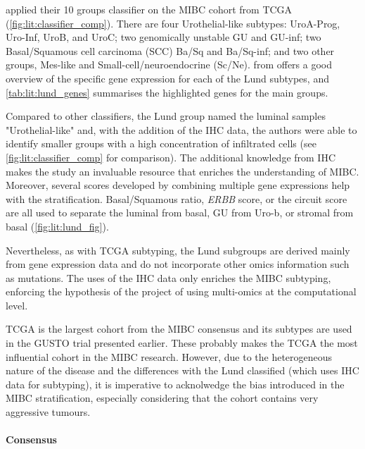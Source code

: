 \citet{Marzouka2018-ge} applied their 10 groups classifier on the MIBC cohort from TCGA (\cref{fig:lit:classifier_comp}). There are four Urothelial-like subtypes: UroA-Prog, Uro-Inf, UroB, and UroC; two genomically unstable GU and GU-inf; two Basal/Squamous cell carcinoma (SCC) Ba/Sq and Ba/Sq-inf; and two other groups, Mes-like and Small-cell/neuroendocrine (Sc/Ne).  from \citet{Marzouka2018-ge} offers a good overview of the specific gene expression for each of the Lund subtypes, and \cref{tab:lit:lund_genes} summarises the highlighted genes for the main groups.


Compared to other classifiers, the Lund group named the luminal samples "Urothelial-like" and, with the addition of the IHC data, the authors were able to identify smaller groups with a high concentration of infiltrated cells (see \cref{fig:lit:classifier_comp} for comparison). The additional knowledge from IHC makes the study an invaluable resource that enriches the understanding of MIBC. Moreover, several scores developed by combining multiple gene expressions help with the stratification. Basal/Squamous ratio, \textit{ERBB} score, or the circuit score are all used to separate the luminal from basal, GU from Uro-b, or stromal from basal (\cref{fig:lit:lund_fig}). 

Nevertheless, as with TCGA subtyping, the Lund subgroups are derived mainly from gene expression data and do not incorporate other omics information such as mutations. The uses of the IHC data only enriches the MIBC subtyping, enforcing the hypothesis of the project of using multi-omics at the computational level.

TCGA is the largest cohort from the MIBC consensus and its subtypes are used in the GUSTO trial presented earlier. These probably makes the TCGA the most influential cohort in the MIBC research. However, due to the heterogeneous nature of the disease and the differences with the Lund classified (which uses IHC data for subtyping), it is imperative to acknolwedge the bias introduced in the MIBC stratification, especially considering that the cohort contains very aggressive tumours.

\paragraph*{Consensus} \label{s:lit:consensus_mibc}

